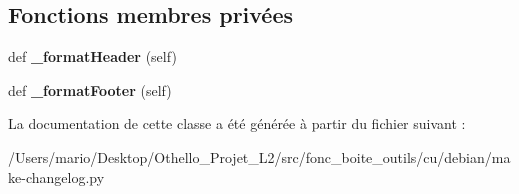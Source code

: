 \subsection*{Fonctions membres privées}
\begin{DoxyCompactItemize}
\item 
\mbox{\label{classmake-changelog_1_1_section_a1ca2eaf0a0a2b311ad0296c69e63e119}} 
def {\bfseries \+\_\+format\+Header} (self)
\item 
\mbox{\label{classmake-changelog_1_1_section_af5115cb9e47fa3719d46c083b0e89103}} 
def {\bfseries \+\_\+format\+Footer} (self)
\end{DoxyCompactItemize}


La documentation de cette classe a été générée à partir du fichier suivant \+:\begin{DoxyCompactItemize}
\item 
/\+Users/mario/\+Desktop/\+Othello\+\_\+\+Projet\+\_\+\+L2/src/fonc\+\_\+boite\+\_\+outils/cu/debian/make-\/changelog.\+py\end{DoxyCompactItemize}
